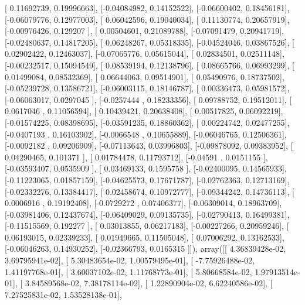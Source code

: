 \documentclass{article}
\begin{document}
       [ 0.11692739,  0.19996663],
       [-0.04084982,  0.14152522],
       [-0.06600402,  0.18456181],
       [-0.06079776,  0.12977003],
       [ 0.06042596,  0.19040034],
       [ 0.11130774,  0.20657919],
       [-0.00976426,  0.129207  ],
       [ 0.00504601,  0.21089788],
       [-0.07091479,  0.20941719],
       [-0.02480637,  0.14817205],
       [ 0.06248267,  0.05318335],
       [-0.04524046,  0.03867526],
       [ 0.02902422,  0.12463037],
       [-0.07065776,  0.05615044],
       [ 0.02834501,  0.02511148],
       [-0.00232517,  0.15094549],
       [ 0.08539194,  0.12138796],
       [ 0.08665766,  0.06993299],
       [ 0.01499084,  0.08532369],
       [ 0.06644063,  0.09514901],
       [ 0.05490976,  0.18737502],
       [-0.05239728,  0.13586721],
       [-0.06003115,  0.18146787],
       [ 0.00336473,  0.05981572],
       [-0.06063017,  0.0297045 ],
       [-0.0257444 ,  0.18233356],
       [ 0.09788752,  0.19512011],
       [ 0.0617046 ,  0.11056594],
       [ 0.10439421,  0.20638408],
       [ 0.00517825,  0.06092219],
       [-0.01574225,  0.08398695],
       [-0.03591235,  0.18860362],
       [ 0.00224742,  0.02477255],
       [-0.0407193 ,  0.16103902],
       [-0.0066548 ,  0.10655889],
       [-0.06046765,  0.12506361],
       [-0.0092182 ,  0.09206909],
       [-0.07113643,  0.03996803],
       [-0.09878092,  0.09383952],
       [ 0.04290465,  0.101371  ],
       [ 0.01784478,  0.11793712],
       [-0.04591   ,  0.0151155 ],
       [-0.03593407,  0.0535909 ],
       [ 0.03469133,  0.1595758 ],
       [-0.02400095,  0.14565933],
       [-0.11223065,  0.01857159],
       [-0.04625573,  0.17671787],
       [-0.02762363,  0.12713169],
       [-0.02332276,  0.13384417],
       [ 0.02458674,  0.10972777],
       [-0.09344242,  0.14736113],
       [ 0.0006916 ,  0.19192408],
       [-0.0729272 ,  0.07406377],
       [-0.06309014,  0.18963709],
       [-0.03981406,  0.12437674],
       [-0.06409029,  0.09135735],
       [-0.02790413,  0.16499381],
       [-0.11515569,  0.192277  ],
       [ 0.03013855,  0.06217183],
       [-0.00227266,  0.20959246],
       [ 0.06193015,  0.02339233],
       [ 0.01949665,  0.11505048],
       [ 0.07006292,  0.13162533],
       [-0.06046263,  0.14930252],
       [-0.02366793,  0.0165315 ]]), array([[  4.36839428e-02,   3.69795941e-02],
       [  5.30483654e-02,   1.00579495e-01],
       [ -7.75926488e-02,   1.41197768e-01],
       [  3.60037102e-02,   1.11768773e-01],
       [  5.80668584e-02,   1.97913514e-01],
       [  3.84589568e-02,   7.38178114e-02],
       [  1.22890904e-02,   6.62240586e-02],
       [  7.27525831e-02,   1.53528138e-01],
\end{document}
